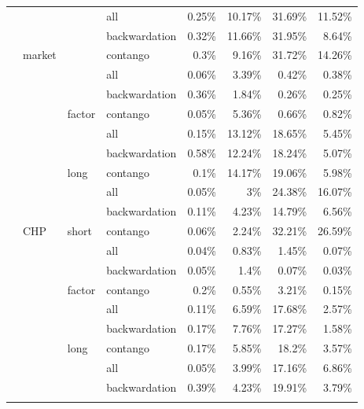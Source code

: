 \documentclass[]{elsarticle} %
\begin{document}
\begin{longtable}[t]{>{}llllrrrr}
\endfoot
\bottomrule
\endlastfoot
 &  &  & all & 0.25\% & 10.17\% & 31.69\% & 11.52\%\\
\nopagebreak
 &  &  & backwardation & 0.32\% & 11.66\% & 31.95\% & 8.64\%\\
\nopagebreak
 & \multirow[t]{-3}{*}{\raggedright\arraybackslash market} &  & contango & 0.3\% & 9.16\% & 31.72\% & 14.26\%\\
\nopagebreak
 &  &  & all & 0.06\% & 3.39\% & 0.42\% & 0.38\%\\
\nopagebreak
 &  &  & backwardation & 0.36\% & 1.84\% & 0.26\% & 0.25\%\\
\nopagebreak
 &  & \multirow[t]{-6}{*}{\raggedright\arraybackslash factor} & contango & 0.05\% & 5.36\% & 0.66\% & 0.82\%\\
\nopagebreak
 &  &  & all & 0.15\% & 13.12\% & 18.65\% & 5.45\%\\
\nopagebreak
 &  &  & backwardation & 0.58\% & 12.24\% & 18.24\% & 5.07\%\\
\nopagebreak
 &  & \multirow[t]{-3}{*}{\raggedright\arraybackslash long} & contango & 0.1\% & 14.17\% & 19.06\% & 5.98\%\\
\nopagebreak
 &  &  & all & 0.05\% & 3\% & 24.38\% & 16.07\%\\
\nopagebreak
 &  &  & backwardation & 0.11\% & 4.23\% & 14.79\% & 6.56\%\\
\nopagebreak
 & \multirow[t]{-9}{*}{\raggedright\arraybackslash CHP} & \multirow[t]{-3}{*}{\raggedright\arraybackslash short} & contango & 0.06\% & 2.24\% & 32.21\% & 26.59\%\\
\nopagebreak
 &  &  & all & 0.04\% & 0.83\% & 1.45\% & 0.07\%\\
\nopagebreak
 &  &  & backwardation & 0.05\% & 1.4\% & 0.07\% & 0.03\%\\
\nopagebreak
 &  & \multirow[t]{-3}{*}{\raggedright\arraybackslash factor} & contango & 0.2\% & 0.55\% & 3.21\% & 0.15\%\\
\nopagebreak
 &  &  & all & 0.11\% & 6.59\% & 17.68\% & 2.57\%\\
\nopagebreak
 &  &  & backwardation & 0.17\% & 7.76\% & 17.27\% & 1.58\%\\
\nopagebreak
 &  & \multirow[t]{-3}{*}{\raggedright\arraybackslash long} & contango & 0.17\% & 5.85\% & 18.2\% & 3.57\%\\
\nopagebreak
 &  &  & all & 0.05\% & 3.99\% & 17.16\% & 6.86\%\\
\nopagebreak
 &  &  & backwardation & 0.39\% & 4.23\% & 19.91\% & 3.79\%\\
\nopagebreak

\end{longtable}
\end{document}
